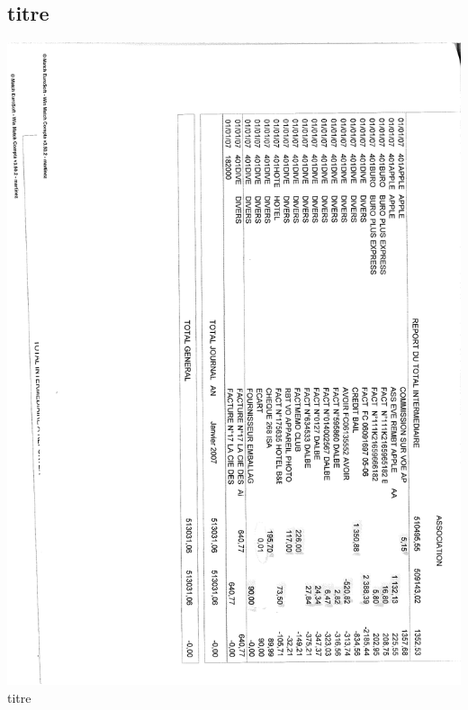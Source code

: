 \subsection{titre}
\begin{center}
\includegraphics[scale=0.6]{annexes/images/bilan_annuel_journaux_b.pdf} \\
titre
\end{center}
